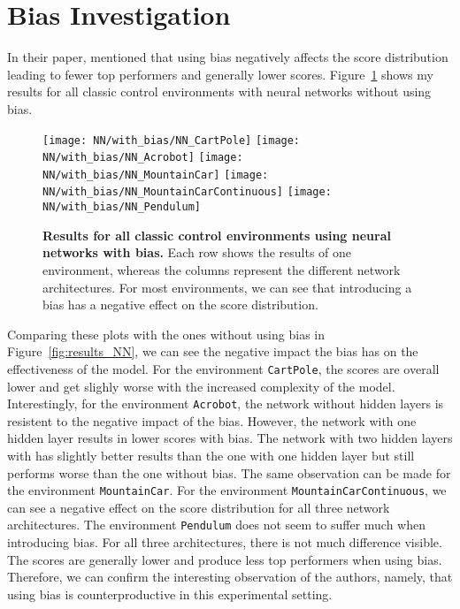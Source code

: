 \section{Bias Investigation}
In their paper, \citet{oller_analyzing_2020} mentioned that using bias negatively affects the score distribution leading to fewer top performers and generally lower scores. Figure~\ref{fig:results_NN_bias} shows my results for all classic control environments with neural networks without using bias.
\begin{figure}[!ht]
  \centering
\texttt{[image: NN/with\_bias/NN\_CartPole]}
\texttt{[image: NN/with\_bias/NN\_Acrobot]}
\texttt{[image: NN/with\_bias/NN\_MountainCar]}
\texttt{[image: NN/with\_bias/NN\_MountainCarContinuous]}
\texttt{[image: NN/with\_bias/NN\_Pendulum]}
\caption[Results for all classic control environments using neural networks with bias]{
  \textbf{Results for all classic control environments using neural networks with bias.}
   Each row shows the results of one environment, whereas the columns represent the different network architectures. For most environments, we can see that introducing a bias has a negative effect on the score distribution.
}
\label{fig:results_NN_bias}
\end{figure}
Comparing these plots with the ones without using bias in Figure~\ref{fig:results_NN}, we can see the negative impact the bias has on the effectiveness of the model. For the environment \verb|CartPole|, the scores are overall lower and get slighly worse with the increased complexity of the model. Interestingly, for the environment \verb|Acrobot|, the network without hidden layers is resistent to the negative impact of the bias. However, the network with one hidden layer results in lower scores with bias. The network with two hidden layers with has slightly better results than the one with one hidden layer but still performs worse than the one without bias. The same observation can be made for the environment \verb|MountainCar|. For the environment \verb|MountainCarContinuous|, we can see a negative effect on the score distribution for all three network architectures. The environment \verb|Pendulum| does not seem to suffer much when introducing bias. For all three architectures, there is not much difference visible. The scores are generally lower and produce less top performers when using bias. Therefore, we can confirm the interesting observation of the authors, namely, that using bias is counterproductive in this experimental setting.

